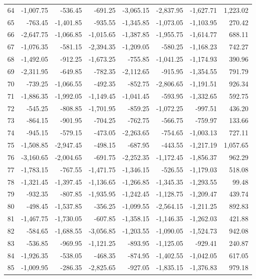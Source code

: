 \begin{longtable}{rrrrrrrr}
64 & -1,007.75 & -536.45 & -691.25 & -3,065.15 & -2,837.95 & -1,627.71 & 1,223.02  \\
65 & -763.45 & -1,401.85 & -935.55 & -1,345.85 & -1,073.05 & -1,103.95 & 270.42  \\
66 & -2,647.75 & -1,066.85 & -1,015.65 & -1,387.85 & -1,955.75 & -1,614.77 & 688.11  \\
67 & -1,076.35 & -581.15 & -2,394.35 & -1,209.05 & -580.25 & -1,168.23 & 742.27  \\
68 & -1,492.05 & -912.25 & -1,673.25 & -755.85 & -1,041.25 & -1,174.93 & 390.96  \\
69 & -2,311.95 & -649.85 & -782.35 & -2,112.65 & -915.95 & -1,354.55 & 791.79  \\
70 & -739.25 & -1,066.55 & -492.35 & -852.75 & -2,806.65 & -1,191.51 & 926.34  \\
71 & -1,886.35 & -1,992.05 & -1,149.45 & -1,041.45 & -593.95 & -1,332.65 & 592.75  \\
72 & -545.25 & -808.85 & -1,701.95 & -859.25 & -1,072.25 & -997.51 & 436.20  \\
73 & -864.15 & -901.95 & -704.25 & -762.75 & -566.75 & -759.97 & 133.66  \\
74 & -945.15 & -579.15 & -473.05 & -2,263.65 & -754.65 & -1,003.13 & 727.11  \\
75 & -1,508.85 & -2,947.45 & -498.15 & -687.95 & -443.55 & -1,217.19 & 1,057.65  \\
76 & -3,160.65 & -2,004.65 & -691.75 & -2,252.35 & -1,172.45 & -1,856.37 & 962.29  \\
77 & -1,783.15 & -767.55 & -1,471.75 & -1,346.15 & -526.55 & -1,179.03 & 518.08  \\
78 & -1,321.45 & -1,397.45 & -1,136.65 & -1,266.85 & -1,345.35 & -1,293.55 & 99.48  \\
79 & -932.35 & -807.85 & -1,935.95 & -1,242.45 & -1,128.75 & -1,209.47 & 439.74  \\
80 & -498.45 & -1,537.85 & -356.25 & -1,099.55 & -2,564.15 & -1,211.25 & 892.83  \\
81 & -1,467.75 & -1,730.05 & -607.85 & -1,358.15 & -1,146.35 & -1,262.03 & 421.88  \\
82 & -584.65 & -1,688.55 & -3,056.85 & -1,203.55 & -1,090.05 & -1,524.73 & 942.08  \\
83 & -536.85 & -969.95 & -1,121.25 & -893.95 & -1,125.05 & -929.41 & 240.87  \\
84 & -1,926.35 & -538.05 & -468.35 & -874.95 & -1,402.55 & -1,042.05 & 617.05  \\
85 & -1,009.95 & -286.35 & -2,825.65 & -927.05 & -1,835.15 & -1,376.83 & 979.18  \\

\end{longtable}
